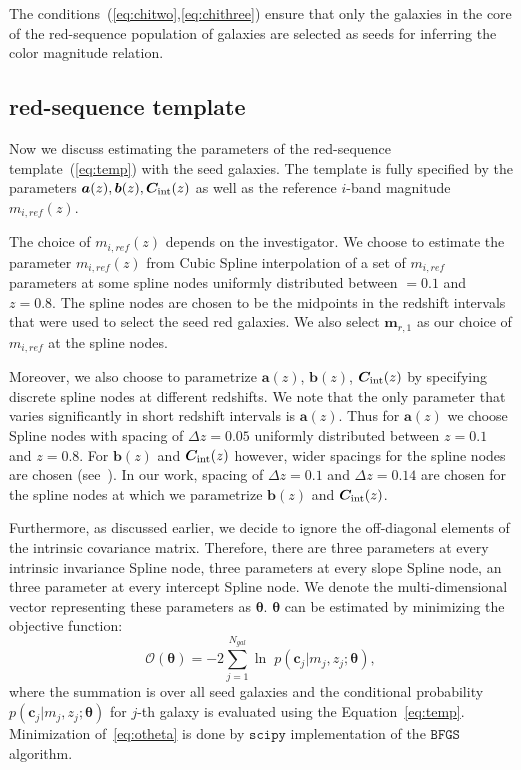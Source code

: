 \documentclass[fleqn,usenatbib]{mnras}
\newcommand{\be}{\begin{equation}}
\newcommand{\ee}{\end{equation}}
\newcommand{\vc}{\bm{c}}
\newcommand{\va}{\bm{a}(z)}
\newcommand{\vb}{\bm{b}(z)}
\newcommand{\vCi}{\bm{C}_{\rm int}(z)}
\begin{document}
The conditions~(\ref{eq:chitwo},\ref{eq:chithree}) ensure that only the galaxies in the core of the red-sequence population of galaxies are selected as seeds for inferring the color magnitude relation.

\subsection{red-sequence template}

Now we discuss estimating the parameters of the red-sequence template~(\ref{eq:temp}) with the seed galaxies. The template is fully specified by the parameters $\va,\vb,\vCi$ as well as the reference $i$-band magnitude $m_{i,ref}(z)$. 

The choice of $m_{i,ref}(z)$ depends on the investigator. 
We choose to estimate the parameter $m_{i,ref}(z)$ from Cubic Spline interpolation of a set of $m_{i,ref}$ parameters at some spline nodes uniformly distributed between $=0.1$ and $z=0.8$. The spline nodes are chosen to be the midpoints in the redshift intervals that were used to select the seed red galaxies. We also select $\mathbf{m}_{r,1}$ as our choice of $m_{i,ref}$ at the spline nodes.

Moreover, we also choose to parametrize $\va$, $\vb$, $\vCi$ by specifying discrete spline nodes at different redshifts. We note that the only parameter that varies significantly in short redshift intervals is $\va$. 
Thus for $\va$ we choose Spline nodes with spacing of $\Delta z = 0.05$ uniformly 
distributed between $z=0.1$ and $z=0.8$. For $\vb$ and $\vCi$ however, wider spacings for the spline nodes are chosen (see~\citealt{redmap_sdss}). In our work, spacing of $\Delta z = 0.1$ and $\Delta z = 0.14$ are chosen for the spline nodes at which we parametrize $\vb$ and $\vCi$. 

Furthermore, as discussed earlier, we decide to ignore the off-diagonal elements of the intrinsic covariance matrix. 
Therefore, there are three parameters at every intrinsic invariance Spline node, three parameters at every slope Spline node, an three parameter at every intercept Spline node. We denote the multi-dimensional vector representing these parameters as $\bm{\theta}$. $\bm{\theta}$ can be estimated by minimizing the objective function:
\be 
\mathcal{O}(\bm{\theta}) = -2\sum_{j=1}^{N_{gal}} \ln \; p(\vc_j|m_j,z_j;\bm{\theta}), 
\label{eq:otheta}
\ee 
where the summation is over all seed galaxies and the conditional probability $p(\vc_j|m_j,z_j;\bm{\theta})$ for $j$-th galaxy is evaluated using the Equation~\ref{eq:temp}. Minimization of~\ref{eq:otheta} is done by $\mathtt{scipy}$ implementation of the $\mathtt{BFGS}$ algorithm. 
\end{document}
